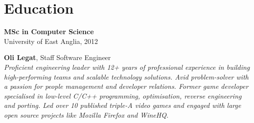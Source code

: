 \documentclass[a4paper,10pt]{article}
\begin{document}
{\begin{minipage}[t]{0.24\textwidth}
{\begin{minipage}[t][\textheight]{\dimexpr\textwidth-10pt}
        \section*{\color{lightblue} Education}
        \textbf{MSc in Computer Science} \\
        University of East Anglia, 2012
        \vfill %
    \end{minipage}%
    }
\end{minipage}%
\hfill%
\begin{minipage}[t]{0.72\textwidth}
    \hspace{-1.55em}
    \colorbox{headerbg}{%
    \begin{minipage}[t]{\dimexpr\textwidth + 0.65em}
        \vspace{0.5cm} %
        {\color{navy} \LARGE \textbf{Oli Legat}}{\Large, Staff Software Engineer}\\[0.5em]
        \textit{Proficient engineering leader with 12+ years of professional experience in building high-performing teams and scalable technology solutions. Avid problem-solver with a passion for people management and developer relations. Former game developer specialised in low-level C/C++ programming, optimisation, reverse engineering and porting. Led over 10 published triple-A video games and engaged with large open source projects like Mozilla Firefox and WineHQ.}
        \vspace{0.3cm}
    \end{minipage}%
    }

\end{minipage}}
\end{document}

